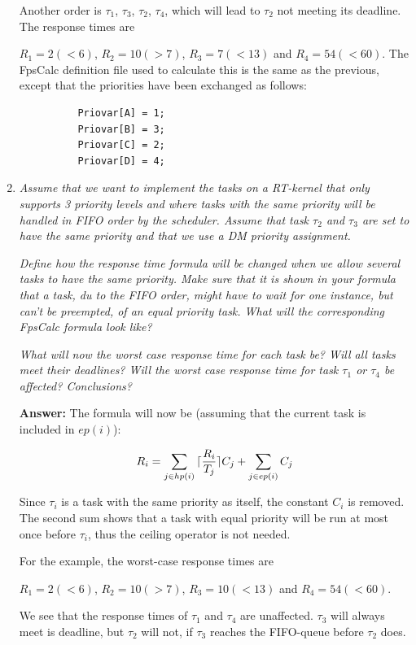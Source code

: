 \documentclass[a4paper,10pt]{article}
\DeclarePairedDelimiter{\ceil}{\lceil}{\rceil}
\newcommand{\answer}{\textbf{Answer: }}
\begin{document}
\begin{enumerate}
	
	Another order is $\tau_1$, $\tau_3$, $\tau_2$, $\tau_4$, which will lead to $\tau_2$ not meeting its deadline. The response times are
	
	$R_1 = 2 (< 6)$, $R_2 = 10 (> 7)$, $R_3 = 7 (< 13)$ and $R_4 = 54 (< 60)$.
	The FpsCalc definition file used to calculate this is the same as the previous, except that the priorities have been exchanged as follows:

        \begin{lstlisting}
          Priovar[A] = 1;
          Priovar[B] = 3;
          Priovar[C] = 2;
          Priovar[D] = 4;
        \end{lstlisting}
	
	\item \emph{Assume that we want to implement the tasks on a RT-kernel that only supports 3 priority levels and where tasks with the same priority will be handled in FIFO order by the scheduler. Assume that task $\tau_2$ and $\tau_3$ are set to have the same priority and that we use a DM priority assignment.}
	
	\emph{Define how the response time formula will be changed when we allow several tasks to have the same priority. Make sure that it is shown in your formula that a task, du to the FIFO order, might have to wait for one instance, but can't be preempted, of an equal priority task. What will the corresponding FpsCalc formula look like?}
	
	\emph{What will now the worst case response time for each task be? Will all tasks meet their deadlines? Will the worst case response time for task $\tau_1$ or $\tau_4$ be affected? Conclusions?}
	
	\answer The formula will now be (assuming that the current task is included in $ep(i)$):
	
	\begin{equation*}
		R_i = \sum_{j \in hp(i)}{\ceil{\frac{R_i}{T_j}}C_j} + \sum_{j \in ep(i)}{C_j}
	\end{equation*}
	
	Since $\tau_i$ is a task with the same priority as itself, the constant $C_i$ is removed. The second sum shows that a task with equal priority will be run at most once before $\tau_i$, thus the ceiling operator is not needed.
	
	For the example, the worst-case response times are
	
	$R_1 = 2 (< 6)$, $R_2 = 10 (> 7)$, $R_3 = 10 (< 13)$ and $R_4 = 54 (< 60)$.
	
	We see that the response times of $\tau_1$ and $\tau_4$ are unaffected. $\tau_3$ will always meet is deadline, but $\tau_2$ will not, if $\tau_3$ reaches the FIFO-queue before $\tau_2$ does.
	

\end{enumerate}
\end{document}
